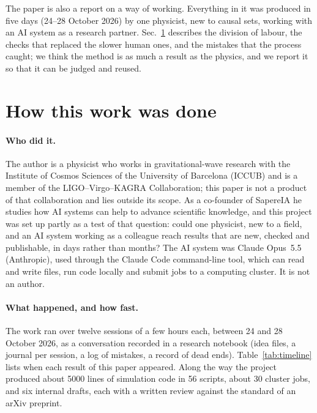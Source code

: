 \documentclass[11pt,a4paper]{article}
\begin{document}
The paper is also a report on a way of working. Everything in it was produced in five days (24--28 October 2026) by one physicist, new to causal sets, working with an AI system as a research partner. Sec.~\ref{sec:method} describes the division of labour, the checks that replaced the slower human ones, and the mistakes that the process caught; we think the method is as much a result as the physics, and we report it so that it can be judged and reused.

\section{How this work was done}\label{sec:method}
\paragraph{Who did it.} The author is a physicist who works in gravitational-wave research with the Institute of Cosmos Sciences of the University of Barcelona (ICCUB) and is a member of the LIGO--Virgo--KAGRA Collaboration; this paper is not a product of that collaboration and lies outside its scope. As a co-founder of SapereIA he studies how AI systems can help to advance scientific knowledge, and this project was set up partly as a test of that question: could one physicist, new to a field, and an AI system working as a colleague reach results that are new, checked and publishable, in days rather than months? The AI system was Claude Opus~5.5 (Anthropic), used through the Claude Code command-line tool, which can read and write files, run code locally and submit jobs to a computing cluster. It is not an author.

\paragraph{What happened, and how fast.} The work ran over twelve sessions of a few hours each, between 24 and 28 October 2026, as a conversation recorded in a research notebook (idea files, a journal per session, a log of mistakes, a record of dead ends). Table~\ref{tab:timeline} lists when each result of this paper appeared. Along the way the project produced about 5000 lines of simulation code in 56 scripts, about 30 cluster jobs, and six internal drafts, each with a written review against the standard of an arXiv preprint.
\end{document}
